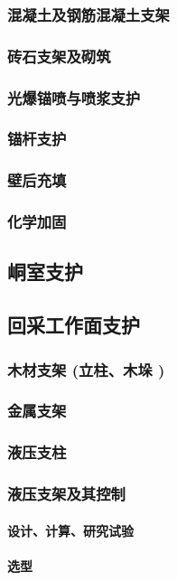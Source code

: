 \documentclass[UTF8]{../../ApplicationUniverse}
\begin{document}
        \subsubsection{混凝土及钢筋混凝土支架}
        \subsubsection{砖石支架及砌筑}
        \subsubsection{光爆锚喷与喷浆支护}
        \subsubsection{锚杆支护}
        \subsubsection{壁后充填}
        \subsubsection{化学加固}
    \subsection{峒室支护}
    \subsection{回采工作面支护}
        \subsubsection{木材支架 (立柱、木垛 )}
        \subsubsection{金属支架}
        \subsubsection{液压支柱}
        \subsubsection{液压支架及其控制}
            \paragraph{设计、计算、研究试验}
            \paragraph{选型}
\end{document}
